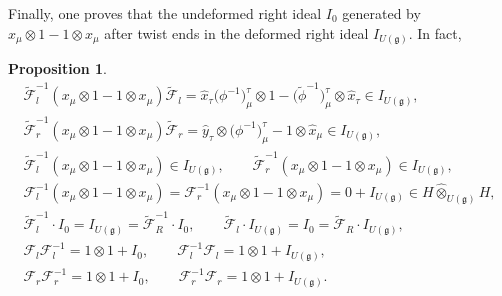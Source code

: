 \documentclass[10pt,a4paper]{amsart}
\def\gg{\mathfrak{g}}
\def\hx{\hat{x}}
\def\hy{\hat{y}}
\newtheorem{Proposition}[Theorem]{Proposition}
 { \theoremstyle{definition}
\newtheorem{Definition}[Theorem]{Definition}
\newtheorem{Example}[Theorem]{Example}
\newtheorem{Remark}[Theorem]{Remark} }
\numberwithin{equation}{section}
\begin{document}
Finally, one proves that the undeformed right ideal $I_0$ generated by $x_\mu\otimes 1 - 1\otimes x_\mu$ after twist ends in the deformed right ideal $I_{U(\gg)}$. In fact,
\begin{Proposition}\label{prop:ideal}
\begin{gather*}
\tilde{\mathcal{F}}_l^{-1}(x_\mu\otimes 1-1\otimes x_\mu)\tilde{\mathcal{F}}_l =
\hat{x}_\tau\big(\phi^{-1}\big)^\tau_\mu\otimes 1 - \big(\tilde\phi^{-1}\big)^\tau_\mu\otimes\hat{x}_\tau\in I_{U(\gg)},
\\
\tilde{\mathcal{F}}_r^{-1}(x_\mu\otimes 1-1\otimes x_\mu)
\tilde{\mathcal{F}}_r =\hy_\tau\otimes\big(\phi^{-1}\big)^\tau_\mu- 1\otimes\hx_\mu \in I_{U(\gg)},
\\
\tilde{\mathcal{F}}_l^{-1}(x_\mu\otimes 1-1\otimes x_\mu)\in I_{U(\gg)},\qquad
\tilde{\mathcal{F}}_r^{-1}(x_\mu\otimes 1-1\otimes x_\mu)\in I_{U(\gg)},
\\
\mathcal{F}_l^{-1}(x_\mu\otimes 1-1\otimes x_\mu) =
\mathcal{F}_r^{-1}(x_\mu\otimes 1-1\otimes x_\mu) = 0 + I_{U(\gg)}
\in H\hat\otimes_{U(\gg)} H,
\\
\tilde{\mathcal{F}}_l^{-1}\cdot I_0 = I_{U(\gg)} = \tilde{\mathcal{F}}_R^{-1}\cdot I_0,
\qquad
\tilde{\mathcal{F}}_l\cdot I_{U(\gg)} = I_0 = \tilde{\mathcal{F}}_R \cdot I_{U(\gg)},
\\
\mathcal{F}_l\mathcal{F}_l^{-1} = 1\otimes 1 + I_0,\qquad
\mathcal{F}_l^{-1}\mathcal{F}_l = 1\otimes 1 + I_{U(\gg)},
\\
\mathcal{F}_r\mathcal{F}_r^{-1} = 1\otimes 1 + I_0,\qquad
\mathcal{F}_r^{-1}\mathcal{F}_r = 1\otimes 1 + I_{U(\gg)}.
\end{gather*}
\end{Proposition}
\end{document}
